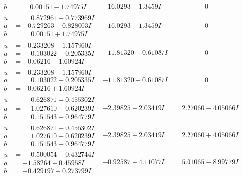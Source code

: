 \documentclass[1p]{elsarticle_modified}
\theoremstyle{definition}
\begin{document}
$$\begin{array}{c|c|c}
\begin{aligned}
b &= \phantom{-}0.00151 - 1.74975 I\end{aligned}
 & -16.0293 - 1.3459 I & \phantom{-0.000000 } 0 \\ \hline\begin{aligned}
u &= \phantom{-}0.872961 - 0.773969 I \\
a &= -0.729263 + 0.828003 I \\
b &= \phantom{-}0.00151 + 1.74975 I\end{aligned}
 & -16.0293 + 1.3459 I & \phantom{-0.000000 } 0 \\ \hline\begin{aligned}
u &= -0.233208 + 1.157960 I \\
a &= \phantom{-}0.103022 - 0.205335 I \\
b &= -0.06216 - 1.60924 I\end{aligned}
 & -11.81320 + 0.61087 I & \phantom{-0.000000 } 0 \\ \hline\begin{aligned}
u &= -0.233208 - 1.157960 I \\
a &= \phantom{-}0.103022 + 0.205335 I \\
b &= -0.06216 + 1.60924 I\end{aligned}
 & -11.81320 - 0.61087 I & \phantom{-0.000000 } 0 \\ \hline\begin{aligned}
u &= \phantom{-}0.626871 + 0.455302 I \\
a &= \phantom{-}1.027610 + 0.620239 I \\
b &= \phantom{-}0.151543 + 0.964779 I\end{aligned}
 & -2.39825 + 2.03419 I & \phantom{-}2.27060 - 4.05066 I \\ \hline\begin{aligned}
u &= \phantom{-}0.626871 - 0.455302 I \\
a &= \phantom{-}1.027610 - 0.620239 I \\
b &= \phantom{-}0.151543 - 0.964779 I\end{aligned}
 & -2.39825 - 2.03419 I & \phantom{-}2.27060 + 4.05066 I \\ \hline\begin{aligned}
u &= \phantom{-}0.500054 + 0.432744 I \\
a &= -1.58264 - 0.45958 I \\
b &= -0.429197 - 0.273799 I\end{aligned}
 & -0.92587 + 4.11077 I & \phantom{-}5.01065 - 8.99779 I \\ \hline\begin{aligned}

\end{aligned}
\end{array}$$
\end{document}
